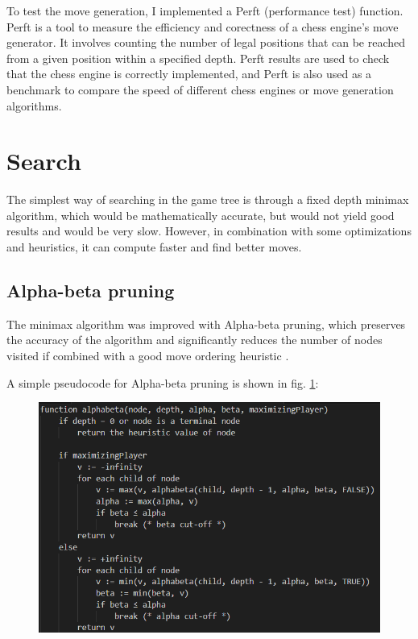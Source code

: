 To test the move generation, I implemented a Perft \cite{perft} (performance test) function. Perft is a tool to measure the efficiency and corectness of a chess engine's move generator. It involves counting the number of legal positions that can be reached from a given position within a specified depth. Perft results are used to check that the chess engine is correctly implemented, and Perft is also used as a benchmark to compare the speed of different chess engines or move generation algorithms.

\section{Search}
\label{sec:ch4sec2}

The simplest way of searching in the game tree is through a fixed depth minimax algorithm, which would be mathematically accurate, but would not yield good results and would be very slow. However, in combination with some optimizations and heuristics, it can compute faster and find better moves.

\subsection{Alpha-beta pruning}
\label{subsec:ch4sec2subsec1}

The minimax algorithm was improved with Alpha-beta pruning, which preserves the accuracy of the algorithm and significantly reduces the number of nodes visited if combined with a good move ordering heuristic \cite{eric1992analysis}.

A simple pseudocode for Alpha-beta pruning is shown in fig. \ref{fig:alphabetaPseudocode}:

\begin{figure}[h]
  \centering
  \includegraphics[scale=0.9]{figures/alphabeta-pseudocode.png}
  \label{fig:alphabetaPseudocode}
\end{figure}

